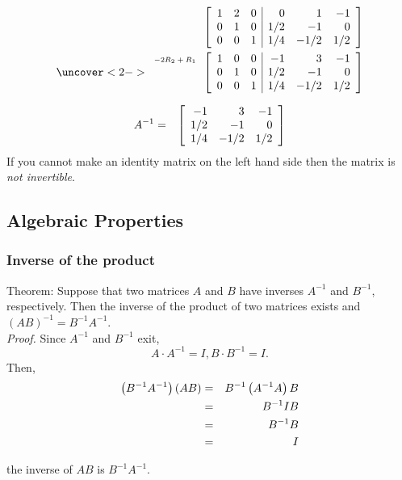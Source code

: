 \begin{frame}
  \begin{eqnarray*}
      \stateThree{~}{~}{~}
      \startRowOpsThree
      \oneRowOpsThree{1}{2}{0}{0}{1}{-1}
      \oneRowOpsThree{0}{1}{0}{1/2}{-1}{0}
      \oneRowOpsThree{0}{0}{1}{1/4}{-1/2}{1/2}
      \stopRowOps \\
    \uncover<2->
    {
      \stateThree{-2R_2+R_1}{~}{~}
      \startRowOpsThree
      \oneRowOpsThree{1}{0}{0}{-1}{3}{-1}
      \oneRowOpsThree{0}{1}{0}{1/2}{-1}{0}
      \oneRowOpsThree{0}{0}{1}{1/4}{-1/2}{1/2}
      \stopRowOps 
    }
  \end{eqnarray*}

  {
    \begin{eqnarray*}
      A^{-1} & =  & \left[ \begin{array}{rrr} -1 & 3 & -1 \\ 1/2 & -1 & 0 \\ 1/4 & -1/2 & 1/2 \end{array} \right]
    \end{eqnarray*}
  }
  {
   If you cannot make an identity matrix on the left hand side then the
   matrix is \textit{not invertible}.
  }
\end{frame}

\subsection{Algebraic Properties}

\begin{frame}
  \frametitle{Inverse of the product}

  {\color{red}Theorem:} Suppose that two matrices $A$ and $B$ have inverses
    $A^{-1}$ and $B^{-1}$, respectively. 
    Then the inverse of the product of two matrices exists and 
    {\color{orange}$(AB)^{-1} = B^{-1}A^{-1}$}.\\

  \textit{{\color{blue}Proof.}} Since $A^{-1}$ and $B^{-1}$ exit,  
   \begin{equation*} A \cdot A^{-1} = I, B \cdot B^{-1}  =  I. \end{equation*}
    Then, 
   \begin{eqnarray*}
    \left( B^{-1} A^{-1} \right) \left( A B \right) & = & B^{-1} \left( A^{-1} A \right) B \\
    & = & B^{-1} I B \\
    & = & B^{-1} B \\
    & = & I
  \end{eqnarray*}

  the inverse of $AB$ is $B^{-1}A^{-1}$.

\end{frame}


